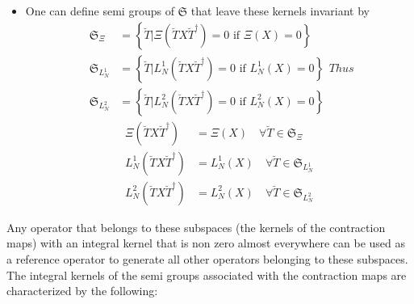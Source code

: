 \documentclass[aps,preprint]{revtex4}%
\begin{document}
\begin{itemize}
\item[*] One can define semi groups of $\mathfrak{S}$ that leave these kernels
invariant by
\begin{subequations}
\begin{align}
\mathfrak{S}_{\Xi}  &  =\left\{  \breve{T}|\Xi\left(  \breve{T}X\breve
{T}^{\dagger}\right)  =0\text{ if }\Xi\left(  X\right)  =0\right\} \\
\mathfrak{S}_{L_{N}^{1}}  &  =\left\{  \breve{T}|L_{N}^{1}\left(  \breve
{T}X\breve{T}^{\dagger}\right)  =0\text{ if }L_{N}^{1}\left(  X\right)
=0\right\} \\
\mathfrak{S}_{L_{N}^{2}}  &  =\left\{  \breve{T}|L_{N}^{2}\left(  \breve
{T}X\breve{T}^{\dagger}\right)  =0\text{ if }L_{N}^{2}\left(  X\right)
=0\right\}
\end{align}
Thus
\end{subequations}
\begin{subequations}
\begin{align}
\Xi\left(  \breve{T}X\breve{T}^{\dagger}\right)   &  =\Xi\left(  X\right)
\quad\forall\breve{T}\in\mathfrak{S}_{\Xi}\\
L_{N}^{1}\left(  \breve{T}X\breve{T}^{\dagger}\right)   &  =L_{N}^{1}\left(
X\right)  \quad\forall\breve{T}\in\mathfrak{S}_{L_{N}^{1}}\\
L_{N}^{2}\left(  \breve{T}X\breve{T}^{\dagger}\right)   &  =L_{N}^{2}\left(
X\right)  \quad\forall\breve{T}\in\mathfrak{S}_{L_{N}^{2}}%
\end{align}

\end{subequations}
\end{itemize}

\begin{enumerate}
Any operator that belongs to these subspaces (the kernels of the contraction
maps) with an integral kernel that is non zero almost everywhere can be used
as a reference operator to generate all other operators belonging to these
subspaces. The integral kernels of the semi groups associated with the
contraction maps are characterized by the following:
\end{enumerate}
\end{document}
